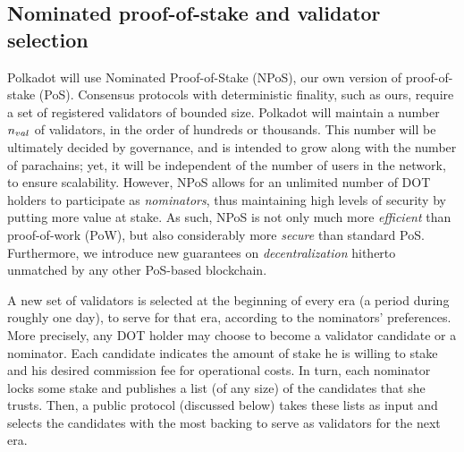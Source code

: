 \subsection{Nominated proof-of-stake and validator selection}\label{sec:validators}


Polkadot will use Nominated Proof-of-Stake (NPoS), our own version of proof-of-stake (PoS). 
Consensus protocols with deterministic finality, such as ours, require a set of registered validators of bounded size. 
Polkadot will maintain a number $n_{val}$ of validators, in the order of hundreds or thousands. 
This number will be ultimately decided by governance, and is intended to grow along with the number of parachains; 
yet, it will be independent of the number of users in the network, to ensure scalability.
However, NPoS allows for an unlimited number of DOT holders to participate as \emph{nominators}, 
thus maintaining high levels of security by putting more value at stake. 
As such, NPoS is not only much more \emph{efficient} than proof-of-work (PoW), 
but also considerably more \emph{secure} than standard PoS.  
Furthermore, we introduce new guarantees on \emph{decentralization} hitherto unmatched by any other PoS-based blockchain.

A new set of validators is selected at the beginning of every era (a period during roughly one day), 
to serve for that era, according to the nominators' preferences. 
More precisely, any DOT holder may choose to become a validator candidate or a nominator. 
Each candidate indicates the amount of stake he is willing to stake and his desired commission fee for operational costs. 
In turn, each nominator locks some stake and publishes a list (of any size) of the candidates that she trusts. 
Then, a public protocol (discussed below) takes these lists as input and selects the candidates 
with the most backing to serve as validators for the next era.

